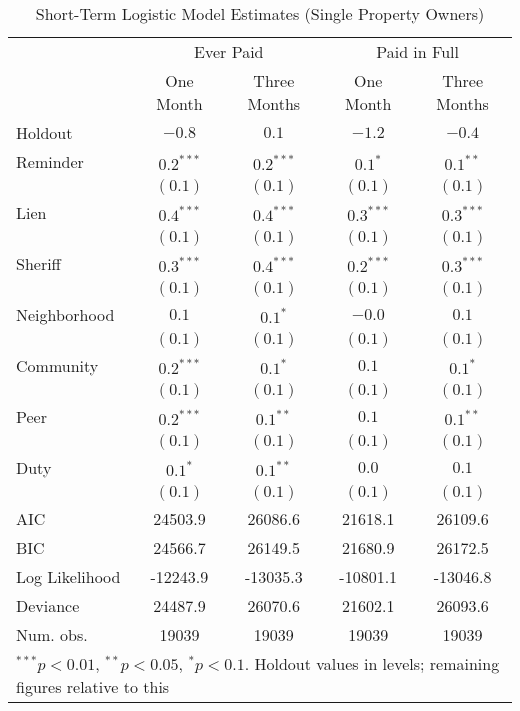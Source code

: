 \documentclass[12pt]{article}
\begin{document}
\begin{appendix}
\begin{table}[htbp]
\caption{Short-Term Logistic Model Estimates (Single Property Owners)}
\begin{center}
\begin{tabular}{l c c c c }
\hline
 & \multicolumn{2}{c}{Ever Paid} & \multicolumn{2}{c}{Paid in Full} \\
 & One Month & Three Months & One Month & Three Months \\
Holdout        & $-0.8$ & $0.1$       & $-1.2$ & $-0.4$ \\
\hline
Reminder       & $0.2^{***}$  & $0.2^{***}$ & $0.1^{*}$    & $0.1^{**}$   \\
               & $(0.1)$      & $(0.1)$     & $(0.1)$      & $(0.1)$      \\
Lien           & $0.4^{***}$  & $0.4^{***}$ & $0.3^{***}$  & $0.3^{***}$  \\
               & $(0.1)$      & $(0.1)$     & $(0.1)$      & $(0.1)$      \\
Sheriff        & $0.3^{***}$  & $0.4^{***}$ & $0.2^{***}$  & $0.3^{***}$  \\
               & $(0.1)$      & $(0.1)$     & $(0.1)$      & $(0.1)$      \\
Neighborhood   & $0.1$        & $0.1^{*}$   & $-0.0$       & $0.1$        \\
               & $(0.1)$      & $(0.1)$     & $(0.1)$      & $(0.1)$      \\
Community      & $0.2^{***}$  & $0.1^{*}$   & $0.1$        & $0.1^{*}$    \\
               & $(0.1)$      & $(0.1)$     & $(0.1)$      & $(0.1)$      \\
Peer           & $0.2^{***}$  & $0.1^{**}$  & $0.1$        & $0.1^{**}$   \\
               & $(0.1)$      & $(0.1)$     & $(0.1)$      & $(0.1)$      \\
Duty           & $0.1^{*}$    & $0.1^{**}$  & $0.0$        & $0.1$        \\
               & $(0.1)$      & $(0.1)$     & $(0.1)$      & $(0.1)$      \\
\hline
AIC            & 24503.9      & 26086.6     & 21618.1      & 26109.6      \\
BIC            & 24566.7      & 26149.5     & 21680.9      & 26172.5      \\
Log Likelihood & -12243.9     & -13035.3    & -10801.1     & -13046.8     \\
Deviance       & 24487.9      & 26070.6     & 21602.1      & 26093.6      \\
Num. obs.      & 19039        & 19039       & 19039        & 19039        \\
\hline
\multicolumn{5}{l}{\scriptsize{$^{***}p<0.01$, $^{**}p<0.05$, $^*p<0.1$. Holdout values in levels; remaining figures relative to this}}
\end{tabular}
\label{sh_logit}
\end{center}
\end{table}


\end{appendix}
\end{document}
